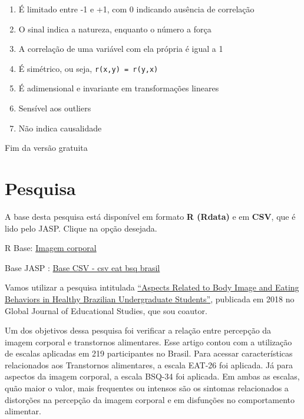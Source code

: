 \documentclass[
]{book}
\providecommand{\tightlist}{%
  \setlength{\itemsep}{0pt}\setlength{\parskip}{0pt}}
\newenvironment{base}{
  \definecolor{shadecolor}{rgb}{0.764,0.992,0.686}  %
  \color{black}
  \begin{shaded}}
 {\end{shaded}}
\begin{document}
\begin{enumerate}
\def\labelenumi{\arabic{enumi}.}
\tightlist
\item
  É limitado entre -1 e +1, com 0 indicando ausência de correlação\\
\item
  O sinal indica a natureza, enquanto o número a força\\
\item
  A correlação de uma variável com ela própria é igual a 1\\
\item
  É simétrico, ou seja, \texttt{r(x,y)\ =\ r(y,x)}\\
\item
  É adimensional e invariante em transformações lineares\\
\item
  Sensível aos outliers\\
\item
  Não indica causalidade
\end{enumerate}

Fim da versão gratuita

\hypertarget{pesquisa-8}{%
\section{Pesquisa}\label{pesquisa-8}}

\begin{base}
A base desta pesquisa está disponível em formato \textbf{R (Rdata)} e em \textbf{CSV}, que é lido pelo JASP. Clique na opção desejada.

R Base: \href{https://github.com/anovabr/mqt/raw/master/bases/Base\%20R\%20-\%20imagem\%20corporal.RData}{Imagem corporal}

Base JASP : \href{https://github.com/anovabr/mqt/raw/master/bases/bases_csv_jasp.zip}{Base CSV - csv eat bsq brasil}

\end{base}

Vamos utilizar a pesquisa intitulada \href{https://www.researchgate.net/publication/323729370_Aspects_Related_to_Body_Image_and_Eating_Behaviors_in_Healthy_Brazilian_Undergraduate_Students}{``Aspects Related to Body Image and Eating Behaviors in Healthy Brazilian Undergraduate Students''}, publicada em 2018 no Global Journal of Educational Studies, que sou coautor.

Um dos objetivos dessa pesquisa foi verificar a relação entre percepção da imagem corporal e transtornos alimentares. Esse artigo contou com a utilização de escalas aplicadas em 219 participantes no Brasil. Para acessar características relacionados aos Transtornos alimentares, a escala EAT-26 foi aplicada. Já para aspectos da imagem corporal, a escala BSQ-34 foi aplicada. Em ambas as escalas, quão maior o valor, mais frequentes ou intensos são os sintomas relacionados a distorções na percepção da imagem corporal e em disfunções no comportamento alimentar.
\end{document}
